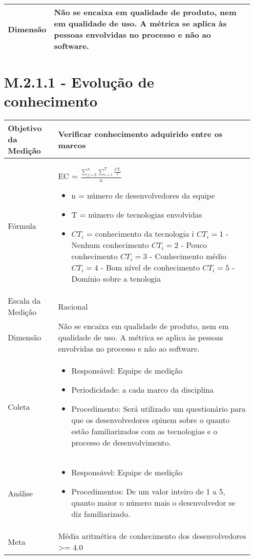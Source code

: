 	\begin{tabular}{ |p{4cm}|p{8cm}| }
	\hline
	   Dimensão 		& 	Não se encaixa em qualidade de produto, nem em qualidade de uso. A métrica se aplica às pessoas envolvidas no processo e não ao software.	 \\
	 \hline
	\end{tabular}

	\section{M.2.1.1 - Evolução de conhecimento} %

	\begin{tabular}{ |p{4cm}|p{8cm}|  }
	 \hline
	 Objetivo da Medição 		& Verificar conhecimento adquirido entre os marcos	   \\
	 \hline
	 Fórmula		& 	EC = $ \frac{\sum_{j=0}^{n}\sum_{i=1}^{T}\frac{CT_i}{T}}{n} $	\begin{itemize}
		\item n = número de desenvolvedores da equipe
		\item T = número de tecnologias envolvidas
		\item $CT_i$ = conhecimento da tecnologia i
		\subitem $CT_i = 1$ - Nenhum conhecimento
		\subitem $CT_i = 2$ - Pouco conhecimento
		\subitem $CT_i = 3$ - Conhecimento médio
		\subitem $CT_i = 4$ - Bom nível de conhecimento
		\subitem $CT_i = 5$ - Domínio sobre a tenologia
	 \end{itemize}\\
	 \hline
	 Escala da Medição 		& 	Racional	 \\
	 \hline
	   Dimensão 		& 	Não se encaixa em qualidade de produto, nem em qualidade de uso. A métrica se aplica às pessoas envolvidas no processo e não ao software.	 \\
	 \hline
	 Coleta		& 	\begin{itemize} \item Responsável: Equipe de medição \item Periodicidade: a cada marco da disciplina \item Procedimento: Será utilizado um questionário para que os desenvolvedores opinem sobre o quanto estão familiarizados com as tecnologias e o processo de desenvolvimento. \end{itemize}		\\
	 \hline
	 Análise		& 	\begin{itemize} \item Responsável: Equipe de medição \item Procedimentos: De um valor inteiro de 1 a 5, quanto maior o número mais o desenvolvedor se diz familiarizado. \end{itemize}	 \\
	 \hline
	 Meta		& 	Média aritmética de conhecimento dos desenvolvedores >= 4.0	 \\
	 \hline
	\end{tabular}


